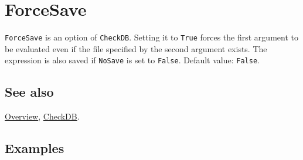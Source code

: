 \documentclass[../FeynCalcManual.tex]{subfiles}
\begin{document}
\hypertarget{forcesave}{
\section{ForceSave}\label{forcesave}}

\texttt{ForceSave} is an option of \texttt{CheckDB}. Setting it to
\texttt{True} forces the first argument to be evaluated even if the file
specified by the second argument exists. The expression is also saved if
\texttt{NoSave} is set to \texttt{False}. Default value: \texttt{False}.

\subsection{See also}

\hyperlink{toc}{Overview}, \hyperlink{checkdb}{CheckDB}.

\subsection{Examples}
\end{document}
